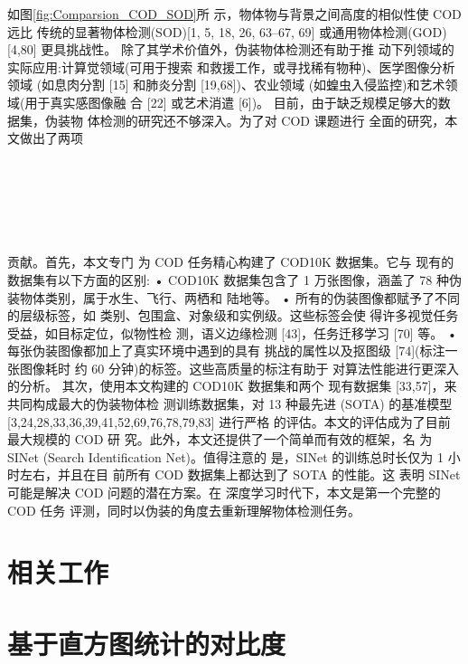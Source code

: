 \documentclass[final]{cvpr}
\renewcommand{\figref}[1]{图\ref{#1}}
\begin{document}
如\figref{fig:Comparsion_COD_SOD}所 示，物体物与背景之间高度的相似性使 COD 远比 传统的显著物体检测(SOD)[1, 5, 18, 26, 63–67, 69] 或通用物体检测(GOD)[4,80] 更具挑战性。
除了其学术价值外，伪装物体检测还有助于推 动下列领域的实际应用:计算觉领域(可用于搜索 和救援工作，或寻找稀有物种)、医学图像分析领域
(如息肉分割 [15] 和肺炎分割 [19,68])、农业领域 (如蝗虫入侵监控)和艺术领域(用于真实感图像融
合 [22] 或艺术消遣 [6])。
目前，由于缺乏规模足够大的数据集，伪装物 体检测的研究还不够深入。为了对 COD 课题进行
全面的研究，本文做出了两项
\\
\\
\\
\\
\\
\\
\\
贡献。首先，本文专门 为 COD 任务精心构建了 COD10K 数据集。它与 现有的数据集有以下方面的区别:
• COD10K 数据集包含了 1 万张图像，涵盖了 78 种伪装物体类别，属于水生、飞行、两栖和 陆地等。
• 所有的伪装图像都赋予了不同的层级标签，如 类别、包围盒、对象级和实例级。这些标签会使 得许多视觉任务受益，如目标定位，似物性检 测，语义边缘检测 [43]，任务迁移学习 [70] 等。
• 每张伪装图像都加上了真实环境中遇到的具有 挑战的属性以及抠图级 [74](标注一张图像耗时 约 60 分钟)的标签。这些高质量的标注有助于 对算法性能进行更深入的分析。
其次，使用本文构建的 COD10K 数据集和两个 现有数据集 [33,57]，来共同构成最大的伪装物体检 测训练数据集，对 13 种最先进 (SOTA) 的基准模型 [3,24,28,33,36,39,41,52,69,76,78,79,83] 进行严格 的评估。本文的评估成为了目前最大规模的 COD 研 究。此外，本文还提供了一个简单而有效的框架，名 为 SINet (Search Identification Net)。值得注意的 是，SINet 的训练总时长仅为 1 小时左右，并且在目 前所有 COD 数据集上都达到了 SOTA 的性能。这 表明 SINet 可能是解决 COD 问题的潜在方案。在 深度学习时代下，本文是第一个完整的 COD 任务 评测，同时以伪装的角度去重新理解物体检测任务。





\section{相关工作}
\label{sec:RelatedWorks}



\section{基于直方图统计的对比度}\label{sec:HC}
\end{document}
